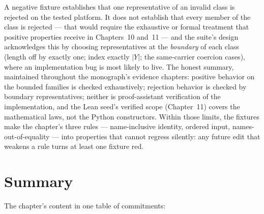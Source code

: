 A negative fixture establishes that one representative of an invalid
class is rejected on the tested platform. It does not establish that
every member of the class is rejected --- that would require the
exhaustive or formal treatment that positive properties receive in
Chapters~10 and~11 --- and the suite's design acknowledges this by
choosing representatives at the \emph{boundary} of each class (length off
by exactly one; index exactly $|Y|$; the same-carrier coercion cases),
where an implementation bug is most likely to live. The honest summary,
maintained throughout the monograph's evidence chapters: positive
behavior on the bounded families is checked exhaustively; rejection
behavior is checked by boundary representatives; neither is
proof-assistant verification of the implementation, and the Lean seed's
verified scope (Chapter~11) covers the mathematical laws, not the Python
constructors. Within those limits, the fixtures make the chapter's three
rules --- name-inclusive identity, ordered input, names-out-of-equality
--- into properties that cannot regress silently: any future edit that
weakens a rule turns at least one fixture red.

\section{Summary}\label{ch03:sec:summary}

The chapter's content in one table of commitments:

